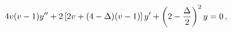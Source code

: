 \begin{equation}
4v(v-1) y'' + 2 \left[ 2 v + (4-\Delta)(v-1)\right] y' + 
\left( 2 -{\Delta \over 2}\right)^2 y = 0\,,
\end{equation}

